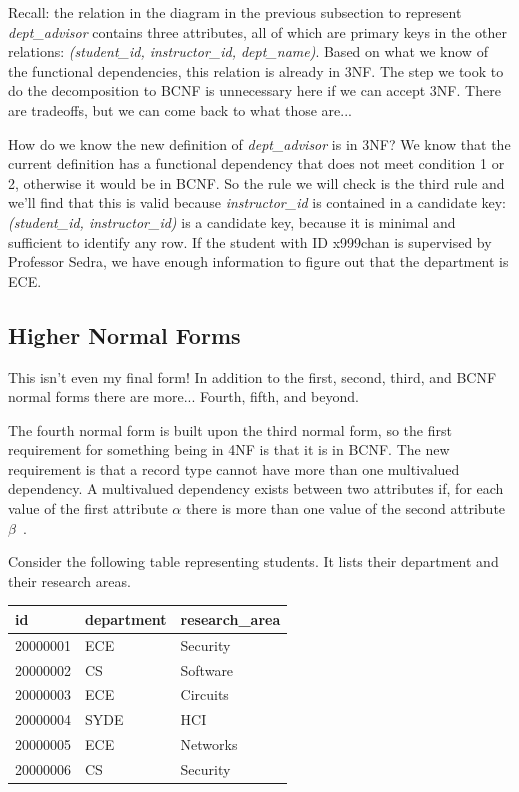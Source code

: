 Recall: the relation in the diagram in the previous subsection to represent \textit{dept\_advisor} contains three attributes, all of which are primary keys in the other relations: \textit{(student\_id, instructor\_id, dept\_name)}. Based on what we know of the functional dependencies, this relation is already in 3NF. The step we took to do the decomposition to BCNF is unnecessary here if we can accept 3NF. There are tradeoffs, but we can come back to what those are...

How do we know the new definition of \textit{dept\_advisor} is in 3NF? We know that the current definition has a functional dependency that does not meet condition 1 or 2, otherwise it would be in BCNF. So the rule we will check is the third rule and we'll find that this is valid because \textit{instructor\_id} is contained in a candidate key: \textit{(student\_id, instructor\_id)} is a candidate key, because it is minimal and sufficient to identify any row. If the student with ID x999chan is supervised by Professor Sedra, we have enough information to figure out that the department is ECE.

\subsection*{Higher Normal Forms}
This isn't even my final form! In addition to the first, second, third, and BCNF normal forms there are more... Fourth, fifth, and beyond. 

The fourth normal form is built upon the third normal form, so the first requirement for something being in 4NF is that it is in BCNF. The new requirement is that a record type cannot have more than one multivalued dependency. A multivalued dependency exists between two attributes if, for each value of the first attribute $\alpha$ there is more than one value of the second attribute $\beta$~\cite{fournorm}. 

Consider the following table representing students. It lists their department and their research areas. 

\begin{center}
\begin{tabular}{|l|l|l|} \hline
	\textbf{id} & \textbf{department} & \textbf{research\_area} \\ \hline
	20000001 & ECE & Security \\ \hline
	20000002 & CS & Software \\ \hline
    20000003 & ECE & Circuits \\ \hline
    20000004 & SYDE & HCI \\ \hline
    20000005 & ECE & Networks \\ \hline
    20000006 & CS & Security \\ \hline
\end{tabular}
\end{center}

